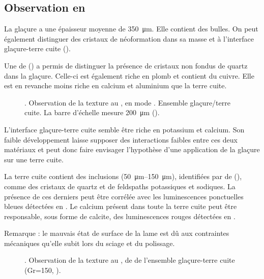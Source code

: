 \subsection{Observation en \MEB[ie]}
La glaçure a une épaisseur moyenne de \SI{350}{\um}. Elle contient des 
bulles. On peut également distinguer des cristaux de néoformation dans 
sa masse et à l'interface glaçure-terre cuite 
().

Une \carto de \RX () a permis de distinguer 
la présence de cristaux non fondus de quartz dans la glaçure. Celle-ci 
est également riche en plomb et contient du cuivre. Elle est en 
revanche moins riche en calcium et aluminium que la terre cuite.

\begin{figure}[p]
  \caption[\ -- Observation de la texture au \MEB, 
           en mode \ERD. Ensemble glaçure/terre cuite]
          {\legendeA.
           Observation de la texture au \MEB, en mode \ERD. 
           Ensemble glaçure/terre cuite. La barre d'échelle mesure 
           \SI{200}{\um} ().}
  \label{MEB:6528_img}
\end{figure}

L'interface glaçure-terre cuite semble être riche en potassium et 
calcium. Son faible développement laisse supposer des interactions 
faibles entre ces deux matériaux  et peut donc faire envisager 
l'hypothèse d'une application de la glaçure sur une terre cuite.

La terre cuite contient des inclusions 
(\SIrange[range-phrase=\ à\ ]{50}{150}{\um}), identifiées par \carto 
de \RX (), comme des cristaux de quartz et de 
feldspaths potassiques et sodiques. La présence de ces derniers peut 
être corrélée avec les luminescences ponctuelles bleues détectées en 
\CL. Le calcium présent dans toute la terre cuite peut être 
responsable, sous forme de calcite, des luminescences rouges détectées 
en \CL.

\noindent Remarque : le mauvais état de surface de la lame est dû aux 
contraintes mécaniques qu'elle subit lors du sciage et du polissage.

\begin{figure}[p]
  \caption[\ -- Observation de la texture au \MEB, 
           \carto de \RX de l'ensemble glaçure-terre cuite]
          {\legendeA.
           Observation de la texture au \MEB, 
           \carto de \RX de l'ensemble glaçure-terre cuite 
           (Gr=150, ).}
  \label{MEB:6528_carto_tcgla}
\end{figure}


